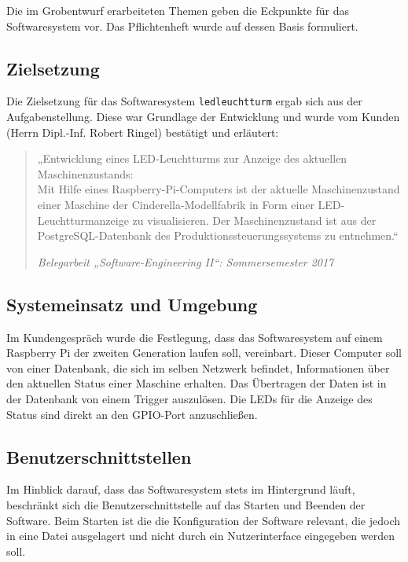 \documentclass{scrartcl}
\date{}
\begin{document}
\maketitle
\tableofcontents

Die im Grobentwurf erarbeiteten Themen geben die Eckpunkte für das Softwaresystem vor. Das Pflichtenheft wurde auf dessen Basis formuliert.

\subsection{Zielsetzung}
Die Zielsetzung für das Softwaresystem \texttt{ledleuchtturm} ergab sich aus der Aufgabenstellung. Diese war Grundlage der Entwicklung und wurde vom Kunden (Herrn Dipl.-Inf. Robert Ringel) bestätigt und erläutert:
\begin{quote}
„Entwicklung eines LED‐Leuchtturms zur Anzeige des aktuellen Maschinenzustands:\\
Mit Hilfe eines Raspberry-Pi-Computers ist der aktuelle Maschinenzustand einer Maschine der Cinderella-Modellfabrik in Form einer LED-Leuchtturmanzeige zu visualisieren. Der Maschinenzustand ist aus der
PostgreSQL-Datenbank des Produktionssteuerungssystems zu entnehmen.“
\begin{flushright}
\textit{Belegarbeit „Software-Engineering II“: Sommersemester 2017}
\end{flushright}
\end{quote}

\subsection{Systemeinsatz und Umgebung}
Im Kundengespräch wurde die Festlegung, dass das Softwaresystem auf einem Raspberry Pi der zweiten Generation laufen soll, vereinbart. Dieser Computer soll von einer Datenbank, die sich im selben Netzwerk befindet, Informationen über den aktuellen Status einer Maschine erhalten. Das Übertragen der Daten ist in der Datenbank von einem Trigger auszulösen. Die LEDs für die Anzeige des Status sind direkt an den GPIO-Port anzuschließen.

\subsection{Benutzerschnittstellen}
Im Hinblick darauf, dass das Softwaresystem stets im Hintergrund läuft, beschränkt sich die Benutzerschnittstelle auf das Starten und Beenden der Software. Beim Starten ist die die Konfiguration der Software relevant, die jedoch in eine Datei ausgelagert und nicht durch ein Nutzerinterface eingegeben werden soll.
\end{document}
